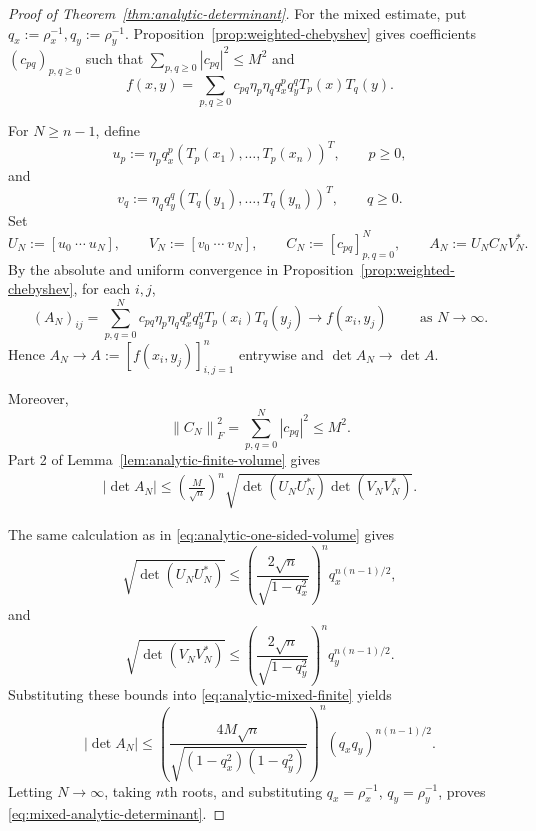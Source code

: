 \documentclass[10pt,a4paper]{amsart}
\newcommand{\abs}[1]{\left\lvert #1\right\rvert}
\newcommand{\norm}[1]{\left\lVert #1\right\rVert}
\begin{document}
\begin{proof}[Proof of Theorem~\ref{thm:analytic-determinant}]
For the mixed estimate, put $
    q_x:=\rho_x^{-1},
    q_y:=\rho_y^{-1}.
$ 
Proposition~\ref{prop:weighted-chebyshev} gives coefficients
\((c_{pq})_{p,q\ge0}\) such that
$
    \sum_{p,q\ge0}\abs{c_{pq}}^2\le M^2
$
and
\[
    f(x,y)
    =
    \sum_{p,q\ge0}
    c_{pq}\eta_p\eta_q
    q_x^pq_y^qT_p(x)T_q(y).
\]

For \(N\ge n-1\), define
\[
    u_p
    :=
    \eta_pq_x^p
    (T_p(x_1),\ldots,T_p(x_n))^T,
    \qquad
    p\ge0,
\]
and
\[
    v_q
    :=
    \eta_qq_y^q
    (T_q(y_1),\ldots,T_q(y_n))^T,
    \qquad
    q\ge0.
\]
Set
\[
    U_N:=[u_0\ \cdots\ u_N],
    \qquad
    V_N:=[v_0\ \cdots\ v_N],
    \qquad
    C_N:=[c_{pq}]_{p,q=0}^N, 
    \qquad
    A_N:=U_NC_NV_N^*.
\]
By the absolute and uniform convergence in
Proposition~\ref{prop:weighted-chebyshev}, for each \(i,j\),
\[
    (A_N)_{ij}
    =
    \sum_{p,q=0}^N
    c_{pq}\eta_p\eta_q
    q_x^pq_y^qT_p(x_i)T_q(y_j)
    \longrightarrow
    f(x_i,y_j) \qquad
     \text{ as } N\to\infty.
\]
Hence
$
    A_N\longrightarrow
    A:=[f(x_i,y_j)]_{i,j=1}^n
$
entrywise and
$
    \det A_N\longrightarrow\det A.
$

Moreover,
\[
    \norm{C_N}_F^2
    =
    \sum_{p,q=0}^N\abs{c_{pq}}^2
    \le M^2.
\]
Part 2 of Lemma~\ref{lem:analytic-finite-volume} gives
\begin{equation}
\begin{aligned}
    \abs{\det A_N}
    \le
    \left(\frac{M}{\sqrt n}\right)^n
    \sqrt{
      \det(U_NU_N^*)\det(V_NV_N^*)
    }.
    \label{eq:analytic-mixed-finite}
\end{aligned}
\end{equation}

The same calculation as in \cref{eq:analytic-one-sided-volume} gives
\[
    \sqrt{\det(U_NU_N^*)}
    \le
    \left(
      \frac{2\sqrt n}{\sqrt{1-q_x^2}}
    \right)^n
    q_x^{n(n-1)/2},
\]
and
\[
    \sqrt{\det(V_NV_N^*)}
    \le
    \left(
      \frac{2\sqrt n}{\sqrt{1-q_y^2}}
    \right)^n
    q_y^{n(n-1)/2}.
\]
Substituting these bounds into
\eqref{eq:analytic-mixed-finite} yields
\[
    \abs{\det A_N}
    \le
    \left(
      \frac{
        4M\sqrt n
      }{
        \sqrt{(1-q_x^2)(1-q_y^2)}
      }
    \right)^n
    (q_xq_y)^{n(n-1)/2}.
\]
Letting \(N\to\infty\), taking \(n\)th roots, and substituting
\(q_x=\rho_x^{-1}\), \(q_y=\rho_y^{-1}\), proves
\eqref{eq:mixed-analytic-determinant}.
\end{proof}
\end{document}
